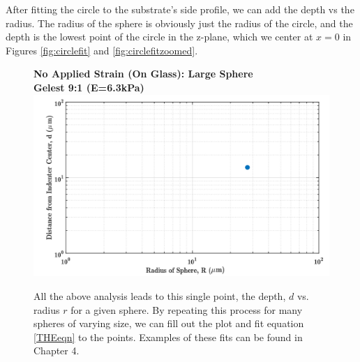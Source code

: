 After fitting the circle to the substrate's side profile, we can add the depth vs the radius. The radius of the sphere is obviously just the radius of the circle, and the depth is the lowest point of the circle in the z-plane, which we center at $ x=0 $ in Figures \ref{fig:circlefit} and \ref{fig:circlefitzoomed}.  

\begin{figure}
	\centering
	{\large \textbf{No Applied Strain (On Glass): Large Sphere}}\\ \vspace{.4em}
	{\large \textbf{Gelest 9:1 (E=6.3kPa)}}
	\includegraphics[width=\linewidth]{Chapters/Figures/sphere011_ia/single_d_vs_r}
	\caption[D vs R plot]{All the above analysis leads to this single point, the depth, $ d $ vs. radius $ r $ for a given sphere. By repeating this process for many spheres of varying size, we can fill out the plot and fit equation \ref{THEeqn} to the points. Examples of these fits can be found in Chapter 4.}
	\label{fig:singledvsr}
\end{figure}
